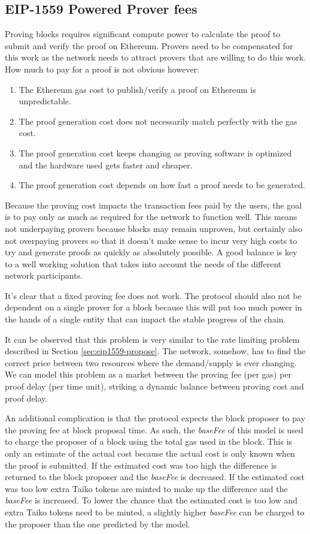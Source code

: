 \documentclass[9pt,oneside]{amsart}
\begin{document}
\begin{multicols}{2}
\subsection{EIP-1559 Powered Prover fees}\label{sec:eip1559-proof}
Proving blocks requires significant compute power to calculate the proof to submit and verify the proof on Ethereum. Provers need to be compensated for this work as the network needs to attract provers that are willing to do this work. How much to pay for a proof is not obvious however:
\begin{enumerate}
\item The Ethereum gas cost to publish/verify a proof on Ethereum is unpredictable.
\item The proof generation cost does not necessarily match perfectly with the gas cost.
\item The proof generation cost keeps changing as proving software is optimized and the hardware used gets faster and cheaper.
\item The proof generation cost depends on how fast a proof needs to be generated.
\end{enumerate}

Because the proving cost impacts the transaction fees paid by the users, the goal is to pay only as much as required for the network to function well. This means not underpaying provers because blocks may remain unproven, but certainly also not overpaying provers so that it doesn't make sense to incur very high costs to try and generate proofs as quickly as absolutely possible. A good balance is key to a well working solution that takes into account the needs of the different network participants.

It's clear that a fixed proving fee does not work. The protocol should also not be dependent on a single prover for a block because this will put too much power in the hands of a single entity that can impact the stable progress of the chain. 

It can be observed that this problem is very similar to the rate limiting problem described in Section \ref{sec:eip1559-propose}. The network, somehow, has to find the correct price between two resources where the demand/supply is ever changing. We can model this problem as a market between the proving fee (per gas) per proof delay (per time unit), striking a dynamic balance between proving cost and proof delay.

An additional complication is that the protocol expects the block proposer to pay the proving fee at block proposal time. As such, the \emph{baseFee} of this model is used to charge the proposer of a block using the total gas used in the block. This is only an estimate of the actual cost because the actual cost is only known when the proof is submitted. If the estimated cost was too high the difference is returned to the block proposer and the \emph{baseFee} is decreased. If the estimated cost was too low extra Taiko tokens are minted to make up the difference and the \emph{baseFee} is increased. To lower the chance that the estimated cost is too low and extra Taiko tokens need to be minted, a slightly higher \emph{baseFee} can be charged to the proposer than the one predicted by the model.


\end{multicols}
\end{document}
